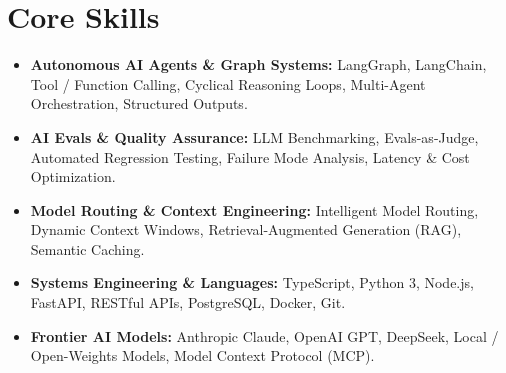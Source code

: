 \documentclass[a4paper,10pt]{article}
\begin{document}
\section{Core Skills}
\begin{itemize}
  \item \textbf{Autonomous AI Agents \& Graph Systems:} LangGraph, LangChain, Tool / Function Calling, Cyclical Reasoning Loops, Multi-Agent Orchestration, Structured Outputs.
  \item \textbf{AI Evals \& Quality Assurance:} LLM Benchmarking, Evals-as-Judge, Automated Regression Testing, Failure Mode Analysis, Latency \& Cost Optimization.
  \item \textbf{Model Routing \& Context Engineering:} Intelligent Model Routing, Dynamic Context Windows, Retrieval-Augmented Generation (RAG), Semantic Caching.
  \item \textbf{Systems Engineering \& Languages:} TypeScript, Python 3, Node.js, FastAPI, RESTful APIs, PostgreSQL, Docker, Git.
  \item \textbf{Frontier AI Models:} Anthropic Claude, OpenAI GPT, DeepSeek, Local / Open-Weights Models, Model Context Protocol (MCP).
\end{itemize}
\end{document}
